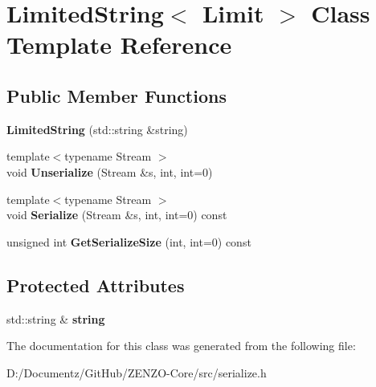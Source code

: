 \hypertarget{class_limited_string}{}\section{Limited\+String$<$ Limit $>$ Class Template Reference}
\label{class_limited_string}
\subsection*{Public Member Functions}
\begin{DoxyCompactItemize}
\item 
\mbox{\label{class_limited_string_afd9b0daa877f4d28c6b909bd34fd597d}} 
{\bfseries Limited\+String} (std\+::string \&string)
\item 
\mbox{\label{class_limited_string_a21ec9b742da8f8ff7b9a8b89131f943b}} 
{\footnotesize template$<$typename Stream $>$ }\\void {\bfseries Unserialize} (Stream \&s, int, int=0)
\item 
\mbox{\label{class_limited_string_acb90369fef0efc1d51b730baa23307d8}} 
{\footnotesize template$<$typename Stream $>$ }\\void {\bfseries Serialize} (Stream \&s, int, int=0) const
\item 
\mbox{\label{class_limited_string_a9b5f6a92ed889442a212444ed51fcea9}} 
unsigned int {\bfseries Get\+Serialize\+Size} (int, int=0) const
\end{DoxyCompactItemize}
\subsection*{Protected Attributes}
\begin{DoxyCompactItemize}
\item 
\mbox{\label{class_limited_string_a3f1d004f4632f7b2fda1a5a5afc266f7}} 
std\+::string \& {\bfseries string}
\end{DoxyCompactItemize}


The documentation for this class was generated from the following file\+:\begin{DoxyCompactItemize}
\item 
D\+:/\+Documentz/\+Git\+Hub/\+Z\+E\+N\+Z\+O-\/\+Core/src/serialize.\+h\end{DoxyCompactItemize}
